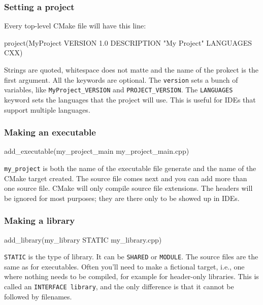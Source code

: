 \subsubsection{Setting a project}
Every top-level CMake file will have this line:
\begin{codeblock}[language=bash][language=C++, numbers=none]
project(MyProject VERSION 1.0
    DESCRIPTION "My Project"
    LANGUAGES CXX)
\end{codeblock}

Strings are quoted, whitespace does not matte and the name of the prokect is the first argument.
All the keywords are optional. The \texttt{version} sets a bunch of variables, like \texttt{MyProject\_VERSION} 
and \texttt{PROJECT\_VERSION}. The \texttt{LANGUAGES} keyword sets the languages that the project will use. This is useful for IDEs that support multiple languages.

\subsubsection{Making an executable}

\begin{codeblock}[language=bash][language=C++, numbers=none]
add_executable(my_project_main my_project_main.cpp)
\end{codeblock}

\texttt{my\_project} is both the name of the executable file generate and the name of the CMake target created.
The source file comes next and you can add more than one source file. CMake will only compile source file extensions. 
The headers will be ignored for most purposes; they are there only to be showed up in IDEs.

\subsubsection{Making a library}

\begin{codeblock}[language=bash][language=C++, numbers=none]
add_library(my_library STATIC my_library.cpp)
\end{codeblock}

\texttt{STATIC} is the type of library. It can be \texttt{SHARED} or \texttt{MODULE}. The source files are the same as for executables.
Often you'll need to make a fictional target, i.e., one where nothing needs to be compiled, for example for header-only libraries. This is called an \texttt{INTERFACE library},
and the only difference is that it cannot be followed by filenames.

